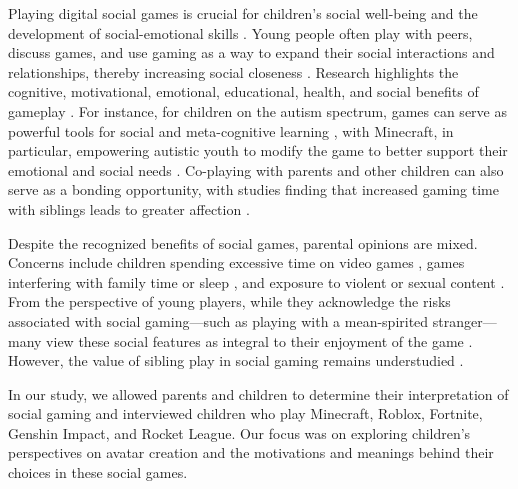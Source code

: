 Playing digital social games is crucial for children's social well-being and the development of social-emotional skills \cite{parkash2022utilizing,Granic2014-aj,przybylski2010motivational}. Young people often play with peers, discuss games, and use gaming as a way to expand their social interactions and relationships, thereby increasing social closeness \cite{lenhart2008teens,Orleans2000, olson2010children, depping2017cooperation}. Research highlights the cognitive, motivational, emotional, educational, health, and social benefits of gameplay \cite{Granic2014-aj}. For instance, for children on the autism spectrum, games can serve as powerful tools for social and meta-cognitive learning \cite{Bartoli2013, Hiniker2013}, with Minecraft, in particular, empowering autistic youth to modify the game to better support their emotional and social needs \cite{Ringland2016}. Co-playing with parents and other children can also serve as a bonding opportunity, with studies finding that increased gaming time with siblings leads to greater affection \cite{coyne2016super,COYNE2011160}.

Despite the recognized benefits of social games, parental opinions are mixed. Concerns include children spending excessive time on video games \cite{mcclain2022parents}, games interfering with family time or sleep \cite{Freed2020}, and exposure to violent or sexual content \cite{kutner2008parents}. From the perspective of young players, while they acknowledge the risks associated with social gaming—such as playing with a mean-spirited stranger\cite{Carter2020}—many view these social features as integral to their enjoyment of the game \cite{livingstone2021playful}. However, the value of sibling play in social gaming remains understudied \cite{kaitlin2024}.

In our study, we allowed parents and children to determine their interpretation of social gaming and interviewed children who play Minecraft, Roblox, Fortnite, Genshin Impact, and Rocket League. Our focus was on exploring children’s perspectives on avatar creation and the motivations and meanings behind their choices in these social games.

